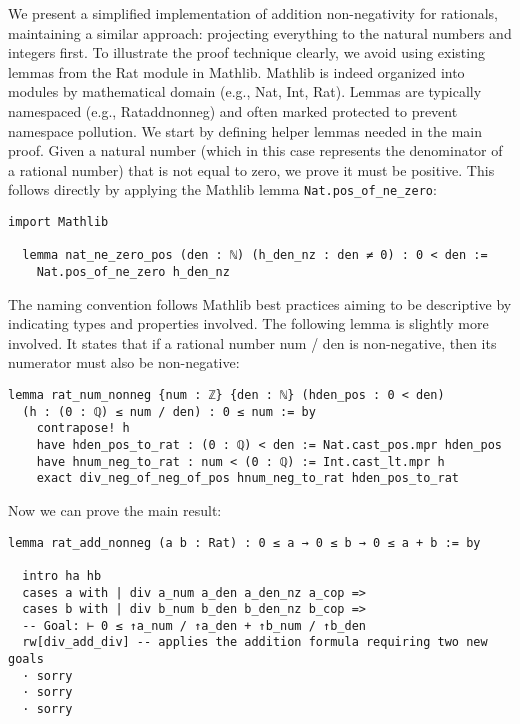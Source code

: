 \begin{example}
We present a simplified implementation of addition non-negativity for rationals, 
maintaining a similar approach: projecting everything to the natural numbers and 
integers first. To illustrate the proof technique clearly, we avoid using existing lemmas 
from the Rat module in Mathlib.
Mathlib is indeed organized into modules by mathematical 
domain (e.g., Nat, Int, Rat). Lemmas are typically namespaced (e.g., Rataddnonneg) 
and often marked protected to prevent namespace pollution. 
We start by defining helper lemmas needed in the main proof.
Given a natural number 
(which in this case represents the denominator of a rational number) that is not 
equal to zero, we prove it must be positive. This follows directly by 
applying the Mathlib lemma \lstinline[language=lean]|Nat.pos_of_ne_zero|:
\begin{lstlisting}[language=lean,  float=!htb]
  import Mathlib

  lemma nat_ne_zero_pos (den : ℕ) (h_den_nz : den ≠ 0) : 0 < den :=
    Nat.pos_of_ne_zero h_den_nz
\end{lstlisting}
The naming convention follows Mathlib 
best practices aiming to be descriptive by indicating 
types and properties involved.
The following lemma is slightly more involved. 
It states that if a rational number num / den 
is non-negative, then its numerator must also be non-negative:
\begin{lstlisting}[language=lean,  float=!htb]
  lemma rat_num_nonneg {num : ℤ} {den : ℕ} (hden_pos : 0 < den)
  (h : (0 : ℚ) ≤ num / den) : 0 ≤ num := by
    contrapose! h
    have hden_pos_to_rat : (0 : ℚ) < den := Nat.cast_pos.mpr hden_pos
    have hnum_neg_to_rat : num < (0 : ℚ) := Int.cast_lt.mpr h
    exact div_neg_of_neg_of_pos hnum_neg_to_rat hden_pos_to_rat
\end{lstlisting}
Now we can prove the main result:
\begin{lstlisting}[language=lean,  float=!htb]
lemma rat_add_nonneg (a b : Rat) : 0 ≤ a → 0 ≤ b → 0 ≤ a + b := by

  intro ha hb
  cases a with | div a_num a_den a_den_nz a_cop =>
  cases b with | div b_num b_den b_den_nz b_cop =>
  -- Goal: ⊢ 0 ≤ ↑a_num / ↑a_den + ↑b_num / ↑b_den
  rw[div_add_div] -- applies the addition formula requiring two new goals 
  · sorry 
  · sorry 
  · sorry
\end{lstlisting}

\newpage


\end{example}
